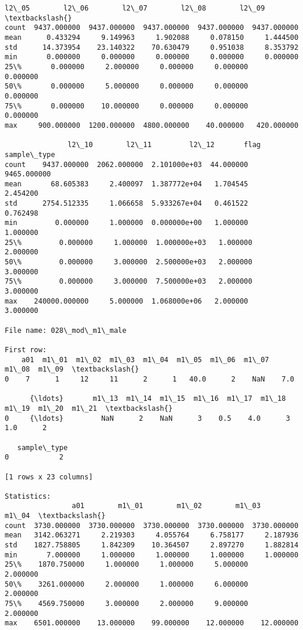 \documentclass[11pt]{article}
\begin{document}
\begin{Verbatim}[commandchars=\\\{\}]
             l2\_05        l2\_06        l2\_07        l2\_08        l2\_09  \textbackslash{}
count  9437.000000  9437.000000  9437.000000  9437.000000  9437.000000   
mean      0.433294     9.149963     1.902088     0.078150     1.444500   
std      14.373954    23.140322    70.630479     0.951038     8.353792   
min       0.000000     0.000000     0.000000     0.000000     0.000000   
25\%       0.000000     2.000000     0.000000     0.000000     0.000000   
50\%       0.000000     5.000000     0.000000     0.000000     0.000000   
75\%       0.000000    10.000000     0.000000     0.000000     0.000000   
max     900.000000  1200.000000  4800.000000    40.000000   420.000000   

               l2\_10        l2\_11         l2\_12       flag  sample\_type  
count    9437.000000  2062.000000  2.101000e+03  44.000000  9465.000000  
mean       68.605383     2.400097  1.387772e+04   1.704545     2.454200  
std      2754.512335     1.066658  5.933267e+04   0.461522     0.762498  
min         0.000000     1.000000  0.000000e+00   1.000000     1.000000  
25\%         0.000000     1.000000  1.000000e+03   1.000000     2.000000  
50\%         0.000000     3.000000  2.500000e+03   2.000000     3.000000  
75\%         0.000000     3.000000  7.500000e+03   2.000000     3.000000  
max    240000.000000     5.000000  1.068000e+06   2.000000     3.000000  

File name: 028\_mod\_m1\_male

First row: 
    a01  m1\_01  m1\_02  m1\_03  m1\_04  m1\_05  m1\_06  m1\_07  m1\_08  m1\_09  \textbackslash{}
0    7      1     12     11      2      1   40.0      2    NaN    7.0   

      {\ldots}       m1\_13  m1\_14  m1\_15  m1\_16  m1\_17  m1\_18  m1\_19  m1\_20  m1\_21  \textbackslash{}
0     {\ldots}         NaN      2    NaN      3    0.5    4.0      3    1.0      2   

   sample\_type  
0            2  

[1 rows x 23 columns]

Statistics: 
                a01        m1\_01        m1\_02        m1\_03        m1\_04  \textbackslash{}
count  3730.000000  3730.000000  3730.000000  3730.000000  3730.000000   
mean   3142.063271     2.219303     4.055764     6.758177     2.187936   
std    1827.758805     1.842309    10.364507     2.897270     1.882814   
min       7.000000     1.000000     1.000000     1.000000     1.000000   
25\%    1870.750000     1.000000     1.000000     5.000000     2.000000   
50\%    3261.000000     2.000000     1.000000     6.000000     2.000000   
75\%    4569.750000     3.000000     2.000000     9.000000     2.000000   
max    6501.000000    13.000000    99.000000    12.000000    12.000000   


\end{Verbatim}
\end{document}

